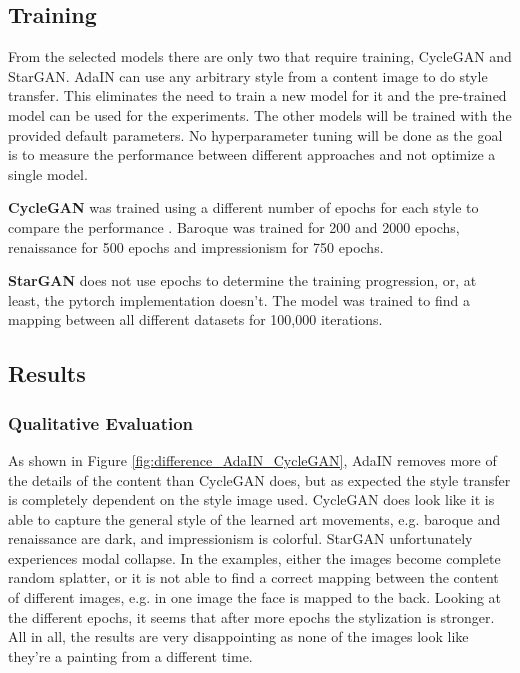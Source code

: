 \newpage
\subsection{Training}
\label{sec:baseline_training_style_transfer}
From the selected models there are only two that require training, CycleGAN and StarGAN.
AdaIN can use any arbitrary style from a content image to do style transfer.
This eliminates the need to train a new model for it and the pre-trained model can be used for the experiments.
The other models will be trained with the provided default parameters.
No hyperparameter tuning will be done as the goal is to measure the performance between different approaches and not optimize a single model.

\textbf{CycleGAN} was trained using a different number of epochs for each style to compare the performance .
Baroque was trained for 200 and 2000 epochs, renaissance for 500 epochs and impressionism for 750 epochs.

\textbf{StarGAN} does not use epochs to determine the training progression, or, at least, the pytorch implementation doesn't.
The model was trained to find a mapping between all different datasets for 100,000 iterations.

\newpage
\subsection{Results}
\label{sec:baseline_results_style_transfer}
\subsubsection{Qualitative Evaluation}
As shown in Figure \ref{fig:difference_AdaIN_CycleGAN}, AdaIN removes more of the details of the content than CycleGAN does, but as expected the style transfer is completely dependent on the style image used.
CycleGAN does look like it is able to capture the general style of the learned art movements, e.g. baroque and renaissance are dark, and impressionism is colorful.
StarGAN unfortunately experiences modal collapse.
In the examples, either the images become complete random splatter, or it is not able to find a correct mapping between the content of different images, e.g. in one image the face is mapped to the back.
Looking at the different epochs, it seems that after more epochs the stylization is stronger.
All in all, the results are very disappointing as none of the images look like they're a painting from a different time.

